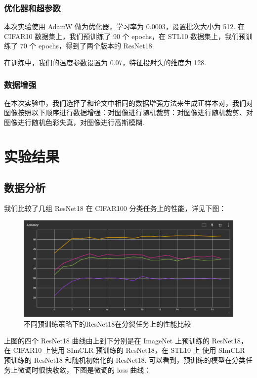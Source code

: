 \documentclass[notitlepage,cs4size,punct,oneside]{ctexrep}
\numberwithin{equation}{chapter}
\theoremstyle{mystyle}
\begin{document}
\subsubsection{优化器和超参数}
本次实验使用 AdamW 做为优化器，学习率为 $0.0003$，设置批次大小为 512. 在 CIFAR10 数据集上，我们预训练了 90 个 epochs，在 STL10 数据集上，我们预训练了 70 个 epochs，得到了两个版本的 ResNet18.

在训练中，我们的温度参数设置为 0.07，特征投射头的维度为 128.

\subsubsection{数据增强}
在本次实验中，我们选择了和论文中相同的数据增强方法来生成正样本对，我们对图像按照以下顺序进行数据增强：对图像进行随机裁剪：对图像进行随机裁剪、对图像进行随机色彩失真，对图像进行高斯模糊.


\section{实验结果}
\subsection{数据分析}

我们比较了几组 ResNet18 在 CIFAR100 分类任务上的性能，详见下图：

\begin{figure}[htpb!]
    \centering
    \includegraphics[width=1\linewidth]{finetune_accuracy.png}
    \caption{不同预训练策略下的ResNet18在分裂任务上的性能比较}
    \label{finetune_accuracy}
\end{figure}

上图的四个 ResNet18 曲线由上到下分别是在 ImageNet 上预训练的 ResNet18，在 CIFAR10 上使用 SImCLR 预训练的 ResNet18，在 STL10 上 使用 SImCLR 预训练的 ResNet18 和随机初始化的 ResNet18. 可以看到，预训练的模型在分类任务上微调时很快收敛，下图是微调的 loss 曲线：
\end{document}

